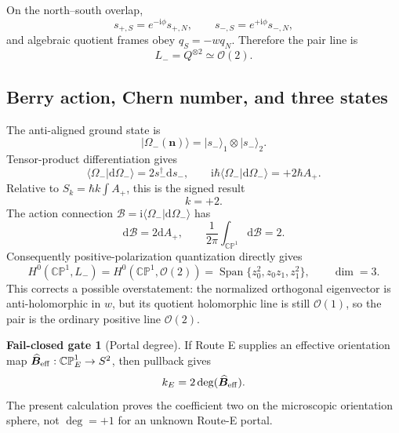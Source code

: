 \documentclass[11pt]{article}
\theoremstyle{definition}
\newtheorem{gate}[theorem]{Fail-closed gate}
\theoremstyle{remark}
\newcommand{\ii}{\mathrm i}
\newcommand{\dd}{\mathrm d}
\newcommand{\CP}{\mathbb {CP}}
\newcommand{\cO}{\mathcal O}
\newcommand{\Span}{\operatorname{Span}}
\newcommand{\ket}[1]{\lvert #1\rangle}
\newcommand{\braket}[2]{\langle #1\vert #2\rangle}
\begin{document}
On the north--south overlap,
\begin{equation}
 s_{+,S}=e^{-\ii\phi}s_{+,N},\qquad
 s_{-,S}=e^{+\ii\phi}s_{-,N},
 \label{eq:anti-transition}
\end{equation}
and algebraic quotient frames obey \(q_S=-wq_N\).  Therefore the pair line is
\begin{equation}
 L_-=Q^{\otimes2}\simeq\cO(2).
 \label{eq:positive-pair-line}
\end{equation}

\subsection{Berry action, Chern number, and three states}

The anti-aligned ground state is
\begin{equation}
 \ket{\Omega_-(\bm n)}=\ket{s_-}_1\otimes\ket{s_-}_2.
 \label{eq:anti-pair}
\end{equation}
Tensor-product differentiation gives
\begin{equation}
 \braket{\Omega_-}{\dd\Omega_-}=2s_-^\dagger\dd s_-,
 \qquad
 \boxed{\ii\hbar\braket{\Omega_-}{\dd\Omega_-}=+2\hbar A_+.}
 \label{eq:positive-action}
\end{equation}
Relative to \(S_k=\hbar k\int A_+\), this is the signed result
\begin{equation}
 \boxed{k=+2.}
 \label{eq:kplus2}
\end{equation}
The action connection \(\mathcal B=\ii\braket{\Omega_-}{\dd\Omega_-}\)
has
\begin{equation}
 \dd\mathcal B=2\dd A_+,\qquad
 \frac1{2\pi}\int_{\CP^1}\dd\mathcal B=2.
 \label{eq:positive-chern}
\end{equation}
Consequently positive-polarization quantization directly gives
\begin{equation}
 H^0(\CP^1,L_-)=H^0(\CP^1,\cO(2))
 =\Span\{z_0^2,z_0z_1,z_1^2\},
 \qquad \dim=3.
 \label{eq:positive-sections}
\end{equation}
This corrects a possible overstatement: the normalized orthogonal eigenvector
is anti-holomorphic in \(w\), but its quotient holomorphic line is still
\(\cO(1)\), so the pair is the ordinary positive line \(\cO(2)\).

\begin{gate}[Portal degree]
If Route E supplies an effective orientation map
\(\widehat{\bm B}_{\rm eff}:\CP^1_E\to S^2\), then pullback gives
\begin{equation}
 k_E=2\deg(\widehat{\bm B}_{\rm eff}).
 \label{eq:portal-degree}
\end{equation}
The present calculation proves the coefficient two on the microscopic
orientation sphere, not \(\deg=+1\) for an unknown Route-E portal.
\end{gate}
\end{document}
